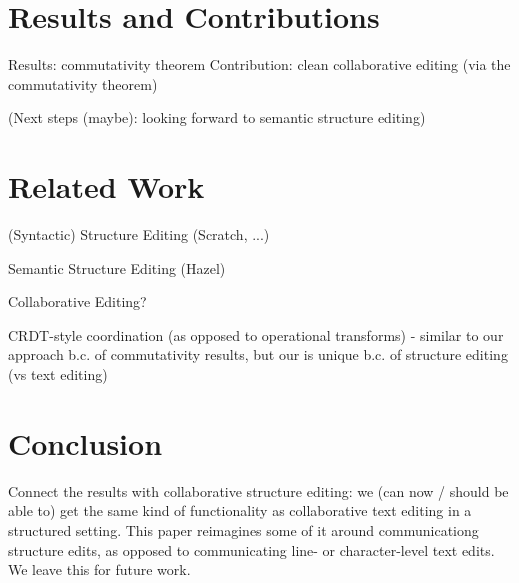 \documentclass[nonacm, acmsmall, screen, review]{acmart}
\begin{document}





\section{Results and Contributions}

Results: commutativity theorem
Contribution: clean collaborative editing (via the commutativity theorem)

(Next steps (maybe): looking forward to semantic structure editing)

\section{Related Work}

(Syntactic) Structure Editing (Scratch, ...)


Semantic Structure Editing (Hazel)

Collaborative Editing?

CRDT-style coordination (as opposed to operational transforms)
- similar to our approach b.c. of commutativity results, but our is unique b.c. of structure editing (vs text editing)

\section{Conclusion}

Connect the results with collaborative structure editing: we (can now / should be able to) get the same kind of functionality as collaborative text editing in a structured setting. 
This paper reimagines some of it around communicationg structure edits, as opposed to communicating line- or character-level text edits.
We leave this for future work.
\end{document}
